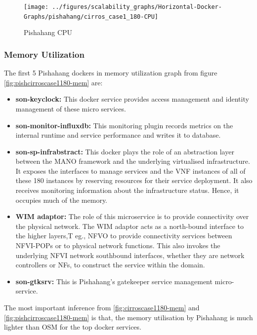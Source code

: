\begin{figure}[h]
	\centering
	\texttt{[image: ../figures/scalability\_graphs/Horizontal-Docker-Graphs/pishahang/cirros\_case1\_180-CPU]}
	\caption{Pishahang CPU}
	\label{fig:pishcirroscase1180-cpu}
\end{figure}
\pagebreak
\subsubsection{Memory Utilization}
The first 5 Pishahang dockers in memory utilization graph  from figure \ref{fig:pishcirroscase1180-mem} are:

\begin{itemize}
	\item \textbf{son-keyclock:} This docker service provides access management and identity management of these micro services.
	\item \textbf{son-monitor-influxdb:} This monitoring plugin records metrics on the internal runtime and service performance and writes it to database.
	\item \textbf{son-sp-infrabstract:}  This docker plays the role of an abstraction layer between the MANO framework and the underlying virtualised infrastructure. It exposes the interfaces to manage services and the VNF instances of all of these 180 instances by reserving resources for their service deployment. It also receives monitoring information about the infrastructure status. Hence, it occupies much of the memory.
	
	\item \textbf{WIM adaptor:} The role of this microservice is to provide connectivity over the physical network. The WIM adaptor acts as a north-bound interface to the higher layers,T eg., NFVO to provide connectivity services between NFVI-POPs or to physical network functions. This also invokes the underlying NFVI network southbound interfaces, whether they are network controllers or NFs, to construct the service within the domain.
	
	\item \textbf{son-gtksrv:} This is Pishahang's gatekeeper service management micro-service.
	
\end{itemize}
 The most important inference from \ref{fig:cirroscase1180-mem} and \ref{fig:pishcirroscase1180-mem} is that, the memory utilisation by Pishahang is much lighter than OSM for the top docker services.



